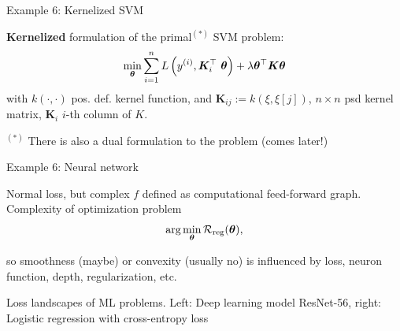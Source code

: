 \documentclass[11pt,compress,t,notes=noshow, xcolor=table]{beamer}
\begin{document}
\begin{framei}{Example 6: Kernelized SVM}
\item \textbf{Kernelized} formulation of the primal$^{(*)}$ SVM problem:
$$ \min_{\bm{\theta}}\sum\limits_{i=1}^n L\left(y^{(i)}, \bm{K}_i^\top ~\bm{\theta}\right) + \lambda \bm{\theta}^\top \bm{K} \bm{\theta} $$
with $k(\cdot, \cdot)$ pos. def. kernel function, and $\bm{K}_{ij} := k(\xi, \xi[j])$, $n \times n$ psd kernel matrix, $\bm{K}_i$ $i$-th column of $K$.
\vfill
{} \spacer
\begin{small}
\item[] $^{(*)}$ There is also a dual formulation to the problem (comes later!)
\end{small}
\end{framei}


\begin{framei}{Example 6: Neural network}
\item Normal loss, but complex $f$ defined as computational feed-forward graph. Complexity of optimization problem
$$ \text{arg} \min_{\bm{\theta}} \mathcal{R}_{\text{reg}}(\bm{\theta}), $$
\item so smoothness (maybe) or convexity (usually no) is influenced by loss, neuron function, depth, regularization, etc.
\vfill
{}
\begin{center} \begin{small}
Loss landscapes of ML problems. Left: Deep learning model ResNet-56, right: Logistic regression with cross-entropy loss
\end{small} \end{center}
\end{framei}

\endlecture
\end{document}
